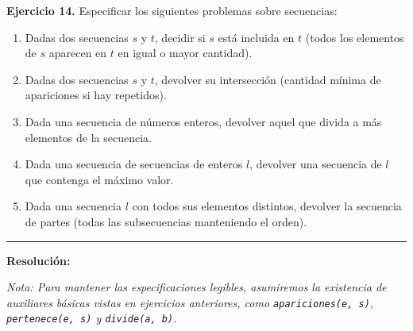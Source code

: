 \hypertarget{ej14}{}
\noindent \textbf{Ejercicio 14.} Especificar los siguientes problemas sobre secuencias:

\begin{enumerate}[label=\alph*)]
    \item Dadas dos secuencias $s$ y $t$, decidir si $s$ está incluida en $t$ (todos los elementos de $s$ aparecen en $t$ en igual o mayor cantidad).
    \item Dadas dos secuencias $s$ y $t$, devolver su intersección (cantidad mínima de apariciones si hay repetidos).
    \item Dada una secuencia de números enteros, devolver aquel que divida a más elementos de la secuencia.
    \item Dada una secuencia de secuencias de enteros $l$, devolver una secuencia de $l$ que contenga el máximo valor.
    \item Dada una secuencia $l$ con todos sus elementos distintos, devolver la secuencia de partes (todas las subsecuencias manteniendo el orden).
\end{enumerate}

\vspace{0.2cm}
{\color{gray}\hrule}
\vspace{0.4cm}

\textbf{Resolución:}

\textit{Nota: Para mantener las especificaciones legibles, asumiremos la existencia de auxiliares básicas vistas en ejercicios anteriores, como \texttt{apariciones(e, s)}, \texttt{pertenece(e, s)} y \texttt{divide(a, b)}.}

